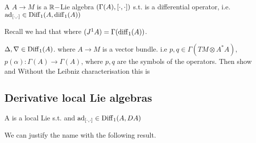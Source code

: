 \documentclass{article}
\begin{document}
\begin{definition}
A  $A \to M$ is a $\mathbb{R}-$Lie algebra $(\Gamma(A),\left[ \cdot, \cdot \right])$ s.t. 
is a differential operator, i.e. $\operatorname{ad}_{\left[ \cdot, \cdot \right]} \in \operatorname{Diff}_1(A,\operatorname{diff}_1(A))$
\end{definition}

Recall we had that 
where $(J^1A) = \Gamma(\operatorname{diff}_1(A))$. 

\begin{ex}
$\Delta, \nabla \in \operatorname{Diff}_1(A)$. where $A\to M$ is a vector bundle. i.e $p,q \in \Gamma(TM \otimes A^\ast A)$, $p(\alpha) : \Gamma(A) \to \Gamma(A)$, where $p,q$ are the symbols of the operators. Then show 
and 
Without the Leibniz characterisation this is 
\end{ex}

\subsection{Derivative local Lie algebras}

\begin{definition}
A  is a local Lie s.t. 
and $\operatorname{ad}_{\left[ \cdot, \cdot \right]} \in \operatorname{Diff}_1(A,DA)$
\end{definition}

We can justify the name with the following result. 
\end{document}
